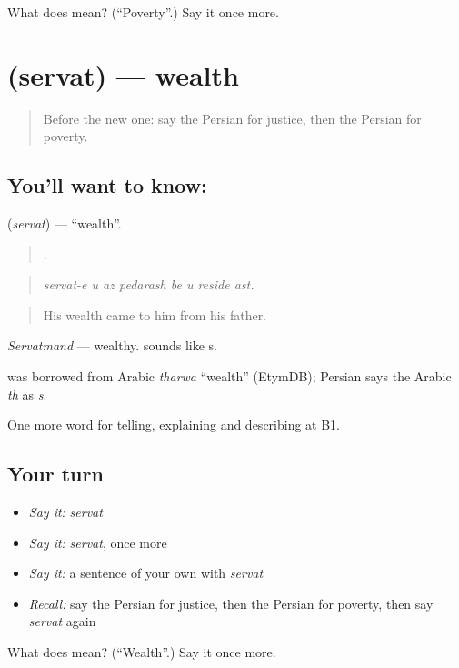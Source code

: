 \begin{tcolorbox}[breakable,colback=teal!4,colframe=teal!35!black,title={Before you move on}]
What does  mean? (\textquotedblleft{}Poverty\textquotedblright{}.) Say it once more.
\end{tcolorbox}
\section[\texorpdfstring{\fa{ثروت} (servat)}{ثروت (servat)}]{ (servat) — wealth}

\label{lesson:FA-C386-servat}



\begin{quote}
Before the new one: say the Persian for justice, then the Persian for poverty.
\end{quote}

\subsection*{You'll want to know: }
\textbf{} (\emph{servat}) — \textquotedblleft{}wealth\textquotedblright{}.

\begin{quote}
       .
\end{quote}

\begin{quote}
\emph{servat-e u az pedarash be u reside ast.}
\end{quote}

\begin{quote}
His wealth came to him from his father.
\end{quote}

\emph{Servatmand} — wealthy.  sounds like s.

\begin{cousinweb}
\textbf{} was borrowed from Arabic \emph{tharwa} \textquotedblleft{}wealth\textquotedblright{} (EtymDB); Persian says the Arabic \emph{th} as \emph{s}.
\end{cousinweb}

\begin{grammarlens}[title={What you've built}]
One more word for telling, explaining and describing at B1.
\end{grammarlens}

\subsection*{Your turn}
\begin{itemize}
\raggedright
  \item \emph{Say it:} \emph{servat}
  \item \emph{Say it:} \emph{servat}, once more
  \item \emph{Say it:} a sentence of your own with \emph{servat}
  \item \emph{Recall:} say the Persian for justice, then the Persian for poverty, then say \emph{servat} again
\end{itemize}

\begin{tcolorbox}[breakable,colback=teal!4,colframe=teal!35!black,title={Before you move on}]
What does  mean? (\textquotedblleft{}Wealth\textquotedblright{}.) Say it once more.
\end{tcolorbox}

